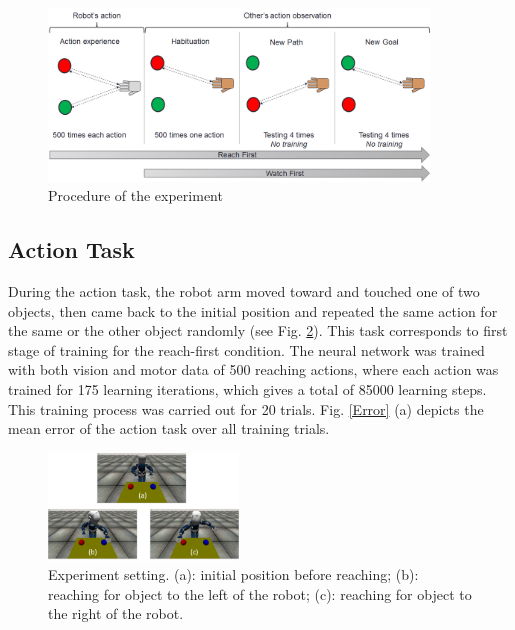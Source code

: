 \documentclass[conference]{IEEEtran}
\begin{document}
\begin{figure}
\centering
\includegraphics[width=0.9\textwidth,natwidth=700,natheight=450]{Figure2.png}
\caption{Procedure of the experiment}
\label{experiment}
\end{figure}

\subsection{Action Task}
During the action task, the robot arm moved toward and touched one of two objects, then came back to the initial position and repeated the same action for the same or the other object randomly (see Fig. \ref{iCub}). This task corresponds to first stage of training for the reach-first condition. The neural network was trained with both vision and motor data of 500 reaching actions, where each action was trained for 175 learning iterations, which gives a total of 85000 learning steps. This training process was carried out for 20 trials. Fig. \ref{Error} (a) depicts the mean error of the action task over all training trials.

\begin{figure}
\centering
\includegraphics[width=0.45\textwidth,natwidth=700,natheight=450]{Simulator.png}
\caption{Experiment setting. (a): initial position before reaching; (b): reaching for object to the left of the robot; (c): reaching for object to the right of the robot.}
\label{iCub} 
\end{figure}
\end{document}
